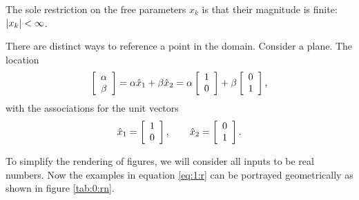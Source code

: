 The sole restriction on the free parameters $x_{k}$ is that their magnitude is finite: $\abs{x_{k}}<\infty$.

There are distinct ways to reference a point in the domain. Consider a plane. The location 
\begin{equation}
  \mat{c}{\alpha\\\beta} = \alpha \hat{x}_{1} + \beta \hat{x}_{2}  = \alpha \mat{c}{1\\0} + \beta \mat{c}{0\\1},
\end{equation}
with the associations for the unit vectors
\begin{equation}
  \hat{x}_{1} = \mat{c}{1\\0}, \qquad \hat{x}_{2} = \mat{c}{0\\1}.
\end{equation}

To simplify the rendering of figures, we will consider all inputs to be real numbers. Now the examples in equation \eqref{eq:1:r} can be portrayed geometrically as shown in figure \eqref{tab:0:rn}.
\begin{table}[htdp]
\caption{Domains of increasing dimension, $\real{n}$. Here we see representations for a point in $\real{1}$, a line; $\real{2}$, a plane and $\real{3}$, a volume. The axes are mutually orthogonal. Each point in the domain is represented by a $n-$vector $x_{k},\ k=1,n$ which defines a distance from the origin.}
\begin{center}
\end{center}
\label{tab:0:rn}
\end{table}%

